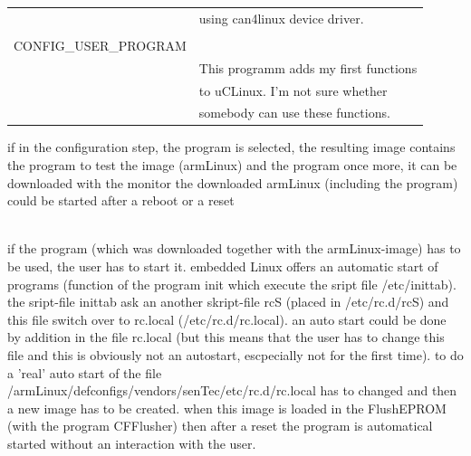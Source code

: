 \begin{description}
\begin{tabular}{l l}
		    & using can4linux device driver.\\
		    & \\
		   CONFIG\_USER\_PROGRAM& \\
		    & This programm adds my first functions \\
		    & to uCLinux. I'm not sure whether \\
		    & somebody can use these functions.\\
		   \end{tabular}
		\os{\newpage}
		\ite if in the configuration step, the program is selected, the resulting image contains the program
		\ite to test the image (armLinux) and the program once more, it can be downloaded with the monitor
		\ite the downloaded armLinux (including the program) could be started after a reboot or a reset
	\ei
\os{\newpage}
\ei
\item[{\rot\bf Autostart of a program with embedded Linux}]~\\
\bi
	\ite if the program (which was downloaded together with the armLinux-image) has to be used, the user has to start it.
	\ite embedded Linux offers an automatic start of programs (function of the program init which execute the sript file /etc/inittab).
	\ite the sript-file inittab ask an another skript-file rcS (placed in /etc/rc.d/rcS) and this file switch over to rc.local (/etc/rc.d/rc.local).
	\ite an auto start could be done by addition in the file rc.local (but this means that the user has to change this file and this is obviously not an autostart, escpecially not for the first time).
	\ite to do a 'real' auto start of the file \\
	/armLinux/defconfigs/vendors/senTec/etc/rc.d/rc.local has to changed and then a new image has to be created.
	\ite when this image is loaded in the FlushEPROM (with the program CFFlusher) then after a reset the program is automatical started without an interaction with the user.
\ei


\end{description}
